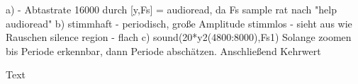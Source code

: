 












a) - Abtastrate 16000 durch [y,Fs] = audioread, da Fs sample rat nach "help audioread"
b) stimmhaft - periodisch, große Amplitude
stimmlos - sieht aus wie Rauschen
silence region - flach
c) 
sound(20*y2(4800:8000),Fs1)
Solange zoomen bis Periode erkennbar, dann Periode abschätzen. Anschließend Kehrwert






Text


